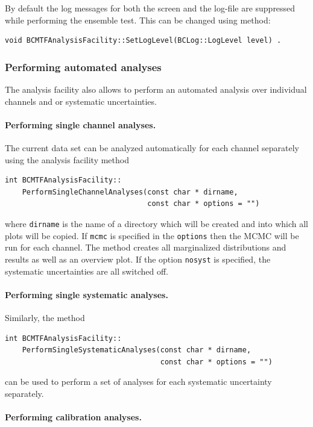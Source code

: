 \documentclass[11pt, a4paper]{article}
\begin{document}
By default the log messages for both the screen and the log-file
are suppressed while performing the ensemble test. This can be
changed using method:
%
\begin{verbatim}
void BCMTFAnalysisFacility::SetLogLevel(BCLog::LogLevel level) .
\end{verbatim}


\subsubsection{Performing automated analyses}

The analysis facility also allows to perform an automated analysis
over individual channels and or systematic uncertainties.

\paragraph{Performing single channel analyses.}

The current data set can be analyzed automatically for each channel
separately using the analysis facility method
%
\begin{verbatim}
int BCMTFAnalysisFacility::
    PerformSingleChannelAnalyses(const char * dirname,
                                 const char * options = "")
\end{verbatim}
%
where \verb|dirname| is the name of a directory which will be created
and into which all plots will be copied. If \verb|mcmc| is specified
in the \verb|options| then the MCMC will be run for each channel. The
method creates all marginalized distributions and results as well as
an overview plot. If the option \verb|nosyst| is specified, the
systematic uncertainties are all switched off.

\paragraph{Performing single systematic analyses.}

Similarly, the method
%
\begin{verbatim}
int BCMTFAnalysisFacility::
    PerformSingleSystematicAnalyses(const char * dirname,
                                    const char * options = "")
\end{verbatim}
%
can be used to perform a set of analyses for each systematic
uncertainty separately.

\paragraph{Performing calibration analyses.}
\end{document}
